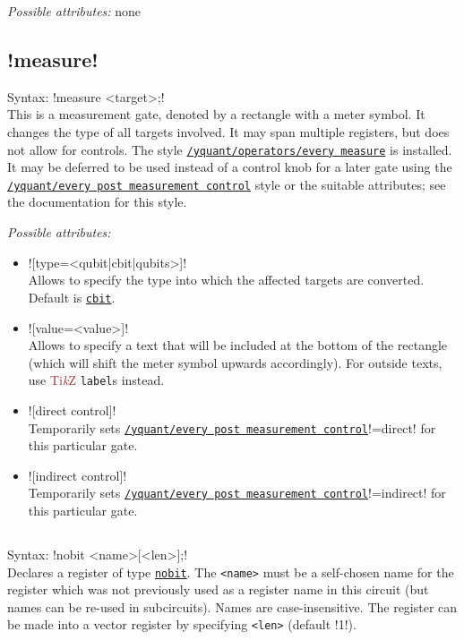 \documentclass{scrartcl}
\def\TikZ{\textcolor{brown}{Ti\textit kZ}}
\def\gate#1{\hyperref[gate:#1]{\texttt{#1}}}
\def\style#1{\hyperref[style:#1]{\texttt{#1}}}
\begin{document}
         \emph{Possible attributes:} none

      \subsection[\texorpdfstring{\yquant{measure}}{measure}]{\yquant!measure!}\label{gate:measure}
         Syntax: \yquant!measure <target>;! \\
         This is a measurement gate, denoted by a rectangle with a meter symbol.
         It changes the type of all targets involved.
         It may span multiple registers, but does not allow for controls.
         The style \style{/yquant/operators/every measure} is installed.
         It may be deferred to be used instead of a control knob for a later gate using the \style{/yquant/every post measurement control} style or the suitable attributes; see the documentation for this style.

         \emph{Possible attributes:}
         \begin{itemize}
            \item \yquant![type=<qubit|cbit|qubits>]! \\
               Allows to specify the type into which the affected targets are converted.
               Default is \gate{cbit}.
            \item \yquant![value=<value>]! \\
               Allows to specify a text that will be included at the bottom of the rectangle (which will shift the meter symbol upwards accordingly).
               For outside texts, use \TikZ{} \texttt{label}s instead.
            \item \yquant![direct control]! \\
               Temporarily sets \style{/yquant/every post measurement control}\tex!=direct! for this particular gate.
            \item \yquant![indirect control]! \\
               Temporarily sets \style{/yquant/every post measurement control}\tex!=indirect! for this particular gate.
         \end{itemize}

      \subsection{\texorpdfstring{}{nobit}}\label{gate:nobit}
         Syntax: \yquant!nobit <name>[<len>];! \\
         Declares a register of type \gate{nobit}.
         The \texttt{<name>} must be a self\hyp chosen name for the register which was not previously used as a register name in this circuit (but names can be re\hyp used in subcircuits).
         Names are case\hyp insensitive.
         The register can be made into a vector register by specifying \texttt{<len>} (default \tex!1!).
\end{document}

